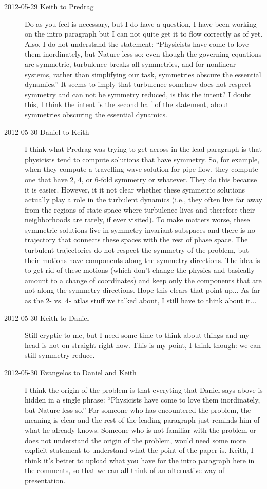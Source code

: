 \begin{description}
\item[2012-05-29 Keith to Predrag]  Do as you feel is necessary, but I do
have a question, I have been working on the intro paragraph but I can not
quite get it to flow correctly as of yet.  Also, I do not understand the
statement:
    ``Physicists have come to love them inordinately, but
Nature less so: even though the governing equations are symmetric,
turbulence breaks all symmetries, and for nonlinear systems, rather than
simplifying our task, symmetries obscure the essential dynamics.''
It seems to imply that turbulence somehow does not respect symmetry and
can not be symmetry reduced, is this the intent?  I doubt this, I think
the intent is the second half of the statement, about symmetries
obscuring the essential dynamics.

\item[2012-05-30 Daniel to Keith] I think what Predrag was trying to get
across in the lead paragraph is that physicists tend to compute solutions
that have symmetry. So, for example, when they compute a travelling wave
solution for pipe flow, they compute one that have 2, 4, or 6-fold
symmetry or whatever. They do this because it is easier. However, it it
not clear whether these symmetric solutions actually play a role in the
turbulent dynamics (i.e., they often live far away from the regions of
state space where turbulence lives and therefore their neighborhoods are
rarely, if ever visited). To make matters worse, these symmetric
solutions live in symmetry invariant subspaces and there is no trajectory
that connects these spaces with the rest of phase space.
	The turbulent trajectories do not respect the symmetry of the
problem, but their motions have components along the symmetry directions.
The idea is to get rid of these motions (which don't change the physics
and basically amount to a change of coordinates) and keep only the
components that are not along the symmetry directions. Hope this clears
that point up...
	As far as the 2- vs. 4- atlas stuff we talked about, I still have to think about it...

\item[2012-05-30 Keith to Daniel]  Still cryptic to me, but I need some
time to think about things and my head is not on straight right now.
This is my point, I think though: we can still symmetry reduce.

\item[2012-05-30 Evangelos to Daniel and Keith] I think the origin of the problem is
that everyting that Daniel says above is hidden in a single phrase:
``Physicists have come to love them inordinately, but
Nature less so.'' For someone who has encountered the problem, the meaning is clear
and the rest of the leading paragraph just reminds him of what he already knows. Someone
who is not familiar with the problem or does not understand the origin of the problem,
would need some more explicit statement to understand what the point of the paper is.
Keith, I think it's better to upload what you have for the intro paragraph here in
the comments, so that we can all think of an alternative way of presentation.


\end{description}
